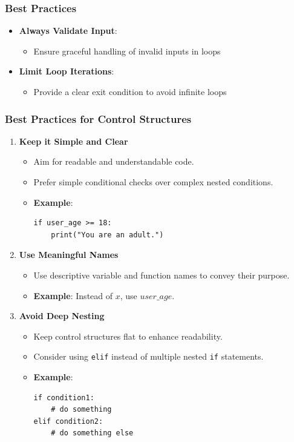 \documentclass{beamer}
\begin{document}
\begin{frame}
    \frametitle{Best Practices}
    \begin{itemize}
        \item \textbf{Always Validate Input}:
            \begin{itemize}
                \item Ensure graceful handling of invalid inputs in loops
            \end{itemize}
        \item \textbf{Limit Loop Iterations}:
            \begin{itemize}
                \item Provide a clear exit condition to avoid infinite loops
            \end{itemize}
    \end{itemize}
\end{frame}

\begin{frame}[fragile]
    \frametitle{Best Practices for Control Structures}
    \begin{enumerate}
        \item \textbf{Keep it Simple and Clear}
        \begin{itemize}
            \item Aim for readable and understandable code.
            \item Prefer simple conditional checks over complex nested conditions.
            \item \textbf{Example}: 
            \begin{lstlisting}
if user_age >= 18:
    print("You are an adult.")
            \end{lstlisting}
        \end{itemize}

        \item \textbf{Use Meaningful Names}
        \begin{itemize}
            \item Use descriptive variable and function names to convey their purpose.
            \item \textbf{Example}: Instead of \(x\), use \(user\_age\).
        \end{itemize}

        \item \textbf{Avoid Deep Nesting}
        \begin{itemize}
            \item Keep control structures flat to enhance readability.
            \item Consider using \texttt{elif} instead of multiple nested \texttt{if} statements.
            \item \textbf{Example}:
            \begin{lstlisting}
if condition1:
    # do something
elif condition2:
    # do something else
            \end{lstlisting}
        \end{itemize}
    \end{enumerate}
\end{frame}
\end{document}
